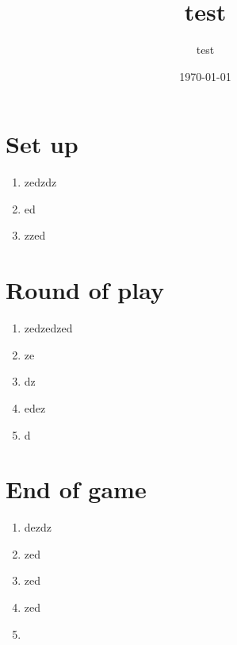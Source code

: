 \documentclass{article}%
\title{test}%
\author{test}%
\date{\today}%
\begin{document}
%
\pagestyle{empty}%
\normalsize%
\maketitle%
\section{ Set up
}%
\label{sec:Setup}%
\begin{enumerate}%
\item%
%
 zedzdz
%
\item%
%
 ed
%
\item%
%
 zzed
%
\end{enumerate}

%
\section{ Round of play
}%
\label{sec:Roundofplay}%
\begin{enumerate}%
\item%
%
 zedzedzed
%
\item%
%
 ze
%
\item%
%
 dz
%
\item%
%
 edez
%
\item%
%
 d
%
\end{enumerate}

%
\section{ End of game
}%
\label{sec:Endofgame}%
\begin{enumerate}%
\item%
%
 dezdz
%
\item%
%
 zed
%
\item%
%
 zed
%
\item%
%
 zed
%
\item%
%
\end{enumerate}

%
\end{document}
